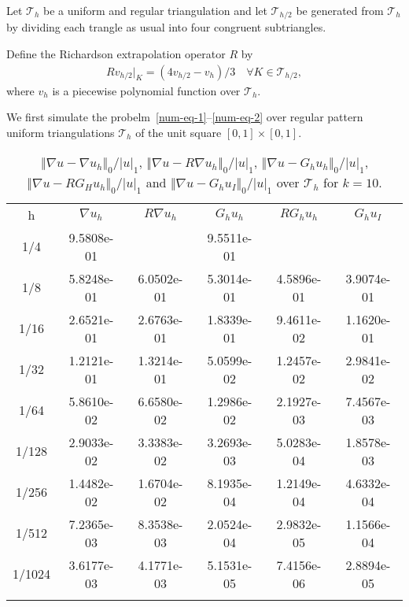 \documentclass[leqno,final]{siamltex}
\numberwithin{equation}{section}
\newcommand{\norm}[1]{\left\Vert#1\right\Vert}
\newcommand{\abs}[1]{\left\vert#1\right\vert}
\newcommand{\na}{\nabla}
\newcommand{\T}{\mathcal{T}}
\newcommand{\eqn}[1]{\begin{align*}#1\end{align*}}
\begin{document}
Let $\T_h$ be a uniform and regular triangulation and let $\T_{h/2}$ be generated from $\T_h$ by dividing each trangle as usual into four congruent subtriangles.

Define the Richardson extrapolation operator $R$ by
\eqn{Rv_{h/2}|_K=(4v_{h/2}-v_{h})/3\quad\forall K\in\T_{h/2},}
where $v_h$ is a piecewise polynomial function over $\T_h$.

We first simulate the probelm~\eqref{num-eq-1}--\eqref{num-eq-2} over regular pattern uniform triangulations $\T_h$ of the unit square $[0,1]\times[0,1]$.

\begin{table}
\begin{center}
\begin{tabular}{|c|c|c|c|c|c|}
\hline\noalign{\smallskip}
h & $\na u_h$ & $R\na u_h$ & $G_hu_h$ & $RG_hu_h$ & $G_hu_I$  \\
\noalign{\smallskip}\hline\noalign{\smallskip}
1/4 &      9.5808e-01   &              &  9.5511e-01 &             &     \\
1/8 &      5.8248e-01   &  6.0502e-01  &  5.3014e-01 &  4.5896e-01 & 3.9074e-01\\
1/16 &     2.6521e-01   &  2.6763e-01  &  1.8339e-01 &  9.4611e-02 & 1.1620e-01\\
1/32 &     1.2121e-01   &  1.3214e-01  &  5.0599e-02 &  1.2457e-02 & 2.9841e-02\\
1/64 &     5.8610e-02   &  6.6580e-02  &  1.2986e-02 &  2.1927e-03 & 7.4567e-03\\
1/128 &    2.9033e-02   &  3.3383e-02  &  3.2693e-03 &  5.0283e-04 & 1.8578e-03\\
1/256 &    1.4482e-02   &  1.6704e-02  &  8.1935e-04 &  1.2149e-04 & 4.6332e-04\\
1/512 &    7.2365e-03   &  8.3538e-03  &  2.0524e-04 &  2.9832e-05 & 1.1566e-04\\
1/1024 &   3.6177e-03   &  4.1771e-03  &  5.1531e-05 &  7.4156e-06 & 2.8894e-05\\
\noalign{\smallskip}\hline
\end{tabular}
\caption{$\norm{\na u-\na u_h}_0/\abs{u}_1$, $\norm{\na u-R\na u_h}_0/\abs{u}_1$, $\norm{\na u-G_h u_h}_0/\abs{u}_1$, $\norm{\na u-RG_H u_h}_0/\abs{u}_1$ and $\norm{\na u-G_h u_I}_0/\abs{u}_1$ over $\T_h$ for $k=10$.}
\label{tab1}
\end{center}
\end{table}
\end{document}
